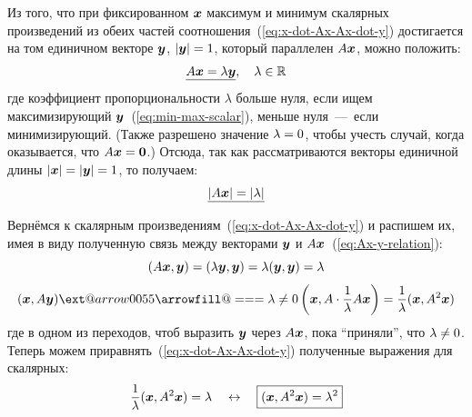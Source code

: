 \documentclass[a4paper,12pt]{article}
\makeatletter
\newcommand*{\Relbarfill@}{\arrowfill@\Relbar\Relbar\Relbar}
\newcommand*{\xeq}[2][]{\ext@arrow 0055\Relbarfill@{#1}{#2}}
\newcommand{\usym}{\resizebox{!}{\fontcharht\font`M}{
  \begin{tikzpicture}[y=0.80pt, x=0.80pt, yscale=-1.000000, xscale=1.000000, inner sep=0pt, outer sep=0pt]
  \begin{scope}[shift={(100.0,1831.0)},nonzero rule]
    \path[draw=.,fill=.,line width=1.600pt] (1626.0000,-813.0000) ..
      controls (1626.0000,-730.3333) and (1600.0000,-664.3333) ..
      (1548.0000,-615.0000) .. controls (1496.6667,-566.3333) and
      (1431.3333,-542.0000) .. (1352.0000,-542.0000) .. controls
      (1342.6667,-542.0000) and (1333.0000,-542.3333) .. (1323.0000,-543.0000) --
      (1177.0000,-555.0000) .. controls (1359.0000,-456.3333) and
      (1450.0000,-348.3333) .. (1450.0000,-231.0000) .. controls
      (1450.0000,-163.0000) and (1423.0000,-102.6667) .. (1369.0000,-50.0000) ..
      controls (1315.6667,2.6667) and (1255.0000,29.0000) .. (1187.0000,29.0000) ..
      controls (1013.6667,29.0000) and (908.0000,-96.6667) .. (870.0000,-348.0000)
      .. controls (858.0000,-286.6667) and (849.0000,-245.3333) ..
      (843.0000,-224.0000) .. controls (829.6667,-177.3333) and (812.6667,-138.0000)
      .. (792.0000,-106.0000) .. controls (734.6667,-16.0000) and (659.0000,29.0000)
      .. (565.0000,29.0000) .. controls (491.0000,29.0000) and (427.0000,2.6667) ..
      (373.0000,-50.0000) .. controls (319.6667,-103.3333) and (293.0000,-166.6667)
      .. (293.0000,-240.0000) .. controls (293.0000,-312.0000) and
      (319.6667,-375.0000) .. (373.0000,-429.0000) .. controls (407.0000,-463.6667)
      and (465.6667,-504.3333) .. (549.0000,-551.0000) -- (432.0000,-545.0000) ..
      controls (343.3333,-540.3333) and (267.6667,-560.6667) .. (205.0000,-606.0000)
      .. controls (135.0000,-656.0000) and (100.0000,-725.0000) ..
      (100.0000,-813.0000) .. controls (100.0000,-889.0000) and (125.0000,-952.6667)
      .. (175.0000,-1004.0000) .. controls (225.6667,-1055.3333) and
      (289.3333,-1081.0000) .. (366.0000,-1081.0000) .. controls
      (457.3333,-1081.0000) and (559.0000,-1025.0000) .. (671.0000,-913.0000) ..
      controls (622.3333,-1033.0000) and (598.0000,-1122.0000) ..
      (598.0000,-1180.0000) .. controls (598.0000,-1256.0000) and
      (621.6667,-1319.0000) .. (669.0000,-1369.0000) .. controls
      (716.3333,-1419.0000) and (777.3333,-1444.0000) .. (852.0000,-1444.0000) ..
      controls (927.3333,-1444.0000) and (991.3333,-1420.0000) ..
      (1044.0000,-1372.0000) .. controls (1098.6667,-1322.0000) and
      (1126.0000,-1260.0000) .. (1126.0000,-1186.0000) .. controls
      (1126.0000,-1120.0000) and (1100.6667,-1032.6667) .. (1050.0000,-924.0000) ..
      controls (1167.3333,-1028.6667) and (1274.0000,-1081.0000) ..
      (1370.0000,-1081.0000) .. controls (1440.6667,-1081.0000) and
      (1501.0000,-1054.3333) .. (1551.0000,-1001.0000) .. controls
      (1601.0000,-947.6667) and (1626.0000,-885.0000) .. (1626.0000,-813.0000) --
      cycle(1505.0000,-805.0000) .. controls (1505.0000,-861.6667) and
      (1485.3333,-908.0000) .. (1446.0000,-944.0000) .. controls
      (1408.0000,-978.0000) and (1360.6667,-995.0000) .. (1304.0000,-995.0000) ..
      controls (1182.0000,-995.0000) and (1090.6667,-941.3333) ..
      (1030.0000,-834.0000) -- (1081.0000,-772.0000) -- (1245.0000,-811.0000) ..
      controls (1283.0000,-820.3333) and (1302.0000,-816.3333) ..
      (1302.0000,-799.0000) .. controls (1302.0000,-787.6667) and
      (1287.0000,-775.3333) .. (1257.0000,-762.0000) -- (1106.0000,-694.0000) --
      (1106.0000,-612.0000) .. controls (1158.6667,-600.0000) and
      (1203.6667,-594.0000) .. (1241.0000,-594.0000) .. controls
      (1311.0000,-594.0000) and (1371.0000,-611.3333) .. (1421.0000,-646.0000) ..
      controls (1477.0000,-684.6667) and (1505.0000,-737.6667) ..
      (1505.0000,-805.0000) -- cycle(1054.0000,-1087.0000) .. controls
      (1054.0000,-1153.6667) and (1038.0000,-1208.3333) .. (1006.0000,-1251.0000) ..
      controls (970.0000,-1297.6667) and (920.0000,-1321.0000) ..
      (856.0000,-1321.0000) .. controls (792.6667,-1321.0000) and
      (744.0000,-1296.0000) .. (710.0000,-1246.0000) .. controls
      (680.0000,-1202.0000) and (665.0000,-1147.0000) .. (665.0000,-1081.0000) ..
      controls (665.0000,-1008.3333) and (691.6667,-938.6667) ..
      (745.0000,-872.0000) -- (821.0000,-899.0000) -- (835.0000,-1069.0000) ..
      controls (837.6667,-1103.0000) and (845.3333,-1120.0000) ..
      (858.0000,-1120.0000) .. controls (865.3333,-1120.0000) and
      (873.3333,-1103.0000) .. (882.0000,-1069.0000) -- (909.0000,-899.0000) --
      (974.0000,-872.0000) .. controls (1027.3333,-945.3333) and
      (1054.0000,-1017.0000) .. (1054.0000,-1087.0000) -- cycle(1341.0000,-276.0000)
      .. controls (1341.0000,-340.6667) and (1313.6667,-399.0000) ..
      (1259.0000,-451.0000) .. controls (1210.3333,-498.3333) and
      (1152.3333,-530.3333) .. (1085.0000,-547.0000) -- (1044.0000,-489.0000) --
      (1134.0000,-346.0000) .. controls (1149.3333,-327.3333) and
      (1157.0000,-311.6667) .. (1157.0000,-299.0000) .. controls
      (1157.0000,-288.3333) and (1151.3333,-283.0000) .. (1140.0000,-283.0000) ..
      controls (1132.6667,-283.0000) and (1117.6667,-294.3333) ..
      (1095.0000,-317.0000) -- (977.0000,-436.0000) -- (909.0000,-412.0000) ..
      controls (907.6667,-401.3333) and (907.0000,-390.3333) .. (907.0000,-379.0000)
      .. controls (907.0000,-306.3333) and (930.3333,-240.6667) ..
      (977.0000,-182.0000) .. controls (1026.3333,-119.3333) and
      (1086.3333,-88.0000) .. (1157.0000,-88.0000) .. controls (1207.0000,-88.0000)
      and (1250.0000,-107.0000) .. (1286.0000,-145.0000) .. controls
      (1322.6667,-183.0000) and (1341.0000,-226.6667) .. (1341.0000,-276.0000) --
      cycle(690.0000,-831.0000) .. controls (618.0000,-937.6667) and
      (527.6667,-991.0000) .. (419.0000,-991.0000) .. controls (365.0000,-991.0000)
      and (318.6667,-972.6667) .. (280.0000,-936.0000) .. controls
      (242.0000,-899.3333) and (223.0000,-854.3333) .. (223.0000,-801.0000) ..
      controls (223.0000,-736.3333) and (252.3333,-683.0000) .. (311.0000,-641.0000)
      .. controls (364.3333,-603.0000) and (425.0000,-584.0000) ..
      (493.0000,-584.0000) .. controls (519.6667,-584.0000) and (563.3333,-592.6667)
      .. (624.0000,-610.0000) -- (624.0000,-692.0000) -- (471.0000,-756.0000) ..
      controls (436.3333,-766.0000) and (419.0000,-778.3333) .. (419.0000,-793.0000)
      .. controls (419.0000,-807.0000) and (439.0000,-810.3333) ..
      (479.0000,-803.0000) -- (645.0000,-772.0000) -- (690.0000,-831.0000) --
      cycle(831.0000,-412.0000) -- (757.0000,-436.0000) -- (641.0000,-309.0000) ..
      controls (627.0000,-290.3333) and (615.3333,-281.0000) .. (606.0000,-281.0000)
      .. controls (596.6667,-281.0000) and (592.0000,-285.6667) ..
      (592.0000,-295.0000) .. controls (592.0000,-304.3333) and (597.3333,-318.6667)
      .. (608.0000,-338.0000) -- (692.0000,-489.0000) -- (645.0000,-549.0000) ..
      controls (483.6667,-491.6667) and (403.0000,-399.3333) .. (403.0000,-272.0000)
      .. controls (403.0000,-223.3333) and (421.6667,-180.3333) ..
      (459.0000,-143.0000) .. controls (497.0000,-106.3333) and (540.3333,-88.0000)
      .. (589.0000,-88.0000) .. controls (657.6667,-88.0000) and
      (716.3333,-119.3333) .. (765.0000,-182.0000) .. controls (811.0000,-240.6667)
      and (834.0000,-305.3333) .. (834.0000,-376.0000) .. controls
      (834.0000,-388.6667) and (833.0000,-400.6667) .. (831.0000,-412.0000) --
      cycle;
  \end{scope}
  \end{tikzpicture}
}}
\theoremstyle{remark}
\makeatother
\begin{document}
  Из того, что при фиксированном $\boldsymbol x$ максимум и минимум скалярных произведений из обеих частей соотношения~(\ref{eq:x-dot-Ax-Ax-dot-y}) достигается на том единичном векторе $\boldsymbol y$, $|\bds y| \hm= 1$, который параллелен $A \boldsymbol x$, можно положить:
  \begin{equation}\label{eq:Ax-y-relation}
    \underline{A \boldsymbol x = \lambda \boldsymbol y}, \quad \lambda \in \operatorname{\mathbb R}
  \end{equation}
  где коэффициент пропорциональности $\lambda$ больше нуля, если ищем максимизирующий $\boldsymbol y$~(\ref{eq:min-max-scalar}), меньше нуля~---~если минимизирующий.
  (Также разрешено значение $\lambda \hm= 0$, чтобы учесть случай, когда оказывается, что $A \bds x \hm= \bds 0$.)
  Отсюда, так как рассматриваются векторы единичной длины $|\bds x| \hm= |\bds y| \hm= 1$, то получаем:
  \begin{equation}\label{eq:Ax-equals-mu}
    \underline{|A \boldsymbol x| = |\lambda|}
  \end{equation}
  
  Вернёмся к скалярным произведениям~(\ref{eq:x-dot-Ax-Ax-dot-y}) и распишем их, имея в виду полученную связь между векторами $\boldsymbol y$ и $A \boldsymbol x$~(\ref{eq:Ax-y-relation}):
  \[
    (A \boldsymbol x, \boldsymbol y) = (\lambda \boldsymbol y, \boldsymbol y) = \lambda (\boldsymbol y, \boldsymbol y) = \lambda
  \]
  \[
    (\bds x, A \bds y) \xeq{\lambda \not= 0} \left(\bds x, A \cdot \frac{1}{\lambda} A \bds x\right) = \frac{1}{\lambda} (\bds x, A^2 \bds x)
  \]
  где в одном из переходов, чтоб выразить $\boldsymbol y$ через $A \boldsymbol x$, пока ``приняли'', что $\lambda \hm{\not=} 0$.
  Теперь можем приравнять~(\ref{eq:x-dot-Ax-Ax-dot-y}) полученные выражения для скалярных:
  \begin{equation}\label{eq:x-A-sq-x}
    \frac{1}{\lambda} (\boldsymbol x, A^2 \boldsymbol x) = \lambda
    \quad\leftrightarrow\quad \boxed{(\boldsymbol x, A^2 \boldsymbol x) = \lambda^2}
  \end{equation}
  
\end{document}
